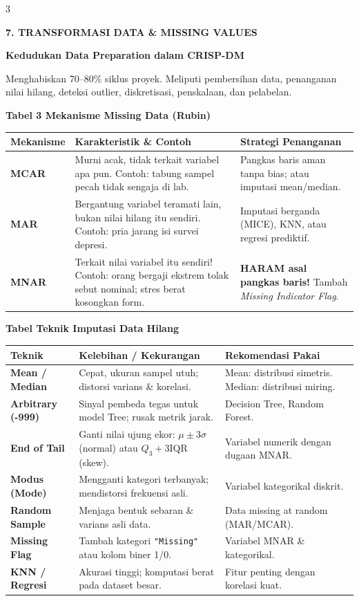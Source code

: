 \documentclass[6.8pt,landscape,a4paper]{extarticle}
\newcommand{\sdtSection}[2][sdtNavy]{%
    \vspace{0.6pt}%
    \noindent\colorbox{#1}{%
        \parbox{\dimexpr\linewidth-2\fboxsep\relax}{%
            \textbf{\fontsize{6.5pt}{7.5pt}\selectfont\color{white}#2}%
        }%
    }\vspace{0.3pt}%
}
\newcommand{\sdtSub}[1]{%
    \vspace{0.5pt}%
    \noindent\textbf{\fontsize{5.8pt}{6.8pt}\selectfont\color{sdtBlue}#1}\vspace{0.1pt}%
}
\begin{document}
\begin{multicols}{3}

\sdtSection{7. TRANSFORMASI DATA \& MISSING VALUES}

\sdtSub{Kedudukan Data Preparation dalam CRISP-DM}
Menghabiskan 70--80\% siklus proyek. Meliputi pembersihan data, penanganan nilai hilang, deteksi outlier, diskretisasi, penskalaan, dan pelabelan.

\sdtSub{Tabel 3 Mekanisme Missing Data (Rubin)}
\begin{center}
{\fontsize{4.8pt}{5.8pt}\selectfont
\begin{tabularx}{\linewidth}{@{}lXX@{}}
\toprule
\textbf{Mekanisme} & \textbf{Karakteristik \& Contoh} & \textbf{Strategi Penanganan} \\
\midrule
\textbf{MCAR} & Murni acak, tidak terkait variabel apa pun. Contoh: tabung sampel pecah tidak sengaja di lab. & Pangkas baris aman tanpa bias; atau imputasi mean/median. \\
\textbf{MAR} & Bergantung variabel teramati lain, bukan nilai hilang itu sendiri. Contoh: pria jarang isi survei depresi. & Imputasi berganda (MICE), KNN, atau regresi prediktif. \\
\textbf{MNAR} & Terkait nilai variabel itu sendiri! Contoh: orang bergaji ekstrem tolak sebut nominal; stres berat kosongkan form. & \textbf{HARAM asal pangkas baris!} Tambah \textit{Missing Indicator Flag}. \\
\bottomrule
\end{tabularx}}
\end{center}

\sdtSub{Tabel Teknik Imputasi Data Hilang}
\begin{center}
{\fontsize{4.8pt}{5.8pt}\selectfont
\begin{tabularx}{\linewidth}{@{}lXl@{}}
\toprule
\textbf{Teknik} & \textbf{Kelebihan / Kekurangan} & \textbf{Rekomendasi Pakai} \\
\midrule
\textbf{Mean / Median} & Cepat, ukuran sampel utuh; distorsi varians \& korelasi. & Mean: distribusi simetris. Median: distribusi miring. \\
\textbf{Arbitrary (-999)} & Sinyal pembeda tegas untuk model Tree; rusak metrik jarak. & Decision Tree, Random Forest. \\
\textbf{End of Tail} & Ganti nilai ujung ekor: $\mu \pm 3\sigma$ (normal) atau $Q_3 + 3\text{IQR}$ (skew). & Variabel numerik dengan dugaan MNAR. \\
\textbf{Modus (Mode)} & Mengganti kategori terbanyak; mendistorsi frekuensi asli. & Variabel kategorikal diskrit. \\
\textbf{Random Sample} & Menjaga bentuk sebaran \& varians asli data. & Data missing at random (MAR/MCAR). \\
\textbf{Missing Flag} & Tambah kategori \texttt{"Missing"} atau kolom biner 1/0. & Variabel MNAR \& kategorikal. \\
\textbf{KNN / Regresi} & Akurasi tinggi; komputasi berat pada dataset besar. & Fitur penting dengan korelasi kuat. \\
\bottomrule
\end{tabularx}}
\end{center}


\end{multicols}
\end{document}
